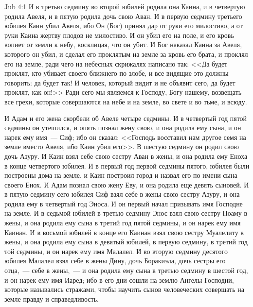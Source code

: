\vs Jub 4:1
И в третью седмину во второй юбилей родила она Каина, и в четвертую родила
Авеля, и в пятую родила дочь свою Аван. И в первую седмину третьего юбилея Каин
убил Авеля, ибо Он (Бог) принял дар от руки его милостиво, а от руки Каина
жертву плодов не милостиво. И он убил его на поле, и его кровь вопиет от земли
к небу, восклицая, что он убит. И Бог наказал Каина за Авеля, которого он убил,
и сделал его проклятым на земле за кровь его брата, и проклял его на
земле, ради чего на небесных скрижалях написано так: <<Да будет проклят,
кто убивает своего ближнего по злобе, и все видящие это должны говорить: да
будет так! И человек, который видит и не объявит сего, да будет проклят, как
он!>> Ради сего мы являемся к Господу, Богу нашему, возвещать все грехи,
которые совершаются на небе и на земле, во свете и во тьме, и всюду.

И Адам и его жена скорбели об Авеле четыре седмины. И в четвертый год пятой
седмины он утешился, и опять познал жену свою, и она родила ему сына, и он
нарек ему имя~--- Сиф; ибо он сказал: <<Господь восставил нам другое
семя на земле вместо Авеля, ибо Каин убил его>>. В шестую седмину он родил
свою дочь Азуру. И Каин взял себе свою сестру Аван в жены, и она родила ему
Еноха в конце четвертого юбилея. И в первый год первой седмины пятого, юбилея
были построены дома на земле, и Каин построил город и назвал его по имени сына
своего Енох. И Адам познал свою жену Еву, и она родила еще девять сыновей. И в
пятую седмину сего юбилея Сиф взял себе в жены свою сестру Азуру, и она родила
ему в четвертый год Эноса. И он первый начал призывать имя Господне на земле. И
в седьмой юбилей в третью седмину Энос взял свою сестру Ноаму в жены, и она
родила ему сына в третий год пятой седмины, и он нарек ему имя Каинан. И в
восьмой юбилей в конце его Каинан взял свою сестру Муалелиту в жены, и
она родила ему сына в девятый юбилей, в первую седмину, в третий год той
седмины, и он нарек ему имя Малалел. И во вторую седмину десятого юбилея
Малалел взял себе в жены Дину, дочь Боракиэла, дочь сестры его отца,~---
себе в жены,~--- и она родила ему сына в третью седмину в шестой год, и он
нарек ему имя Иаред; ибо в его дни сошли на землю Ангелы Господни, которые
назывались стражами, чтобы научить сынов человеческих совершать на земле правду
и справедливость.

